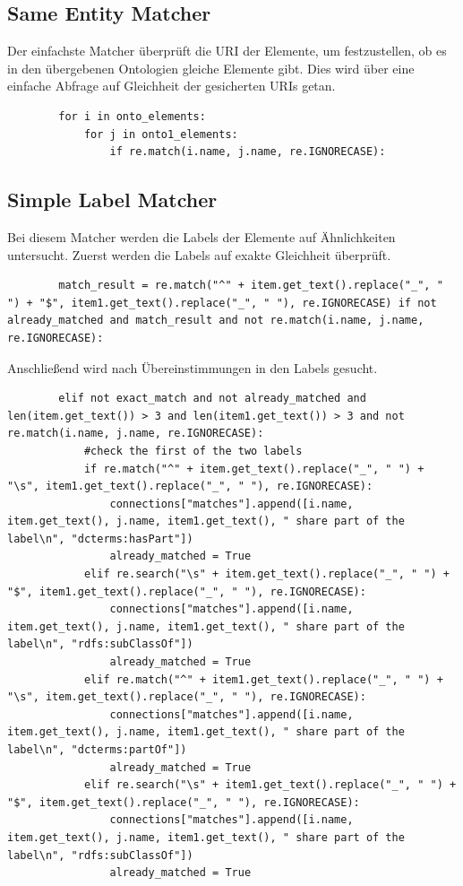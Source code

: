 		\subsection{Same Entity Matcher}
		Der einfachste Matcher überprüft die URI der Elemente, um festzustellen, ob es
		in den übergebenen Ontologien gleiche Elemente gibt. Dies wird über eine
		einfache Abfrage auf Gleichheit der gesicherten URIs getan.
		\begin{lstlisting}
		for i in onto_elements:
			for j in onto1_elements:
				if re.match(i.name, j.name, re.IGNORECASE):
		\end{lstlisting}
		
		\subsection{Simple Label Matcher}
		\label{simpleOntologyMatcher}
		Bei diesem Matcher werden die Labels der Elemente auf Ähnlichkeiten
		untersucht.
		Zuerst werden die Labels auf exakte Gleichheit überprüft.
		\begin{lstlisting}
		match_result = re.match("^" + item.get_text().replace("_", " ") + "$", item1.get_text().replace("_", " "), re.IGNORECASE) if not already_matched and match_result and not re.match(i.name, j.name, re.IGNORECASE):
		\end{lstlisting}
		Anschließend wird nach Übereinstimmungen in den Labels gesucht.
		\begin{lstlisting}
		elif not exact_match and not already_matched and len(item.get_text()) > 3 and len(item1.get_text()) > 3 and not re.match(i.name, j.name, re.IGNORECASE):
            #check the first of the two labels
            if re.match("^" + item.get_text().replace("_", " ") + "\s", item1.get_text().replace("_", " "), re.IGNORECASE):
                connections["matches"].append([i.name, item.get_text(), j.name, item1.get_text(), " share part of the label\n", "dcterms:hasPart"])
                already_matched = True
            elif re.search("\s" + item.get_text().replace("_", " ") + "$", item1.get_text().replace("_", " "), re.IGNORECASE):
                connections["matches"].append([i.name, item.get_text(), j.name, item1.get_text(), " share part of the label\n", "rdfs:subClassOf"])
                already_matched = True
            elif re.match("^" + item1.get_text().replace("_", " ") + "\s", item.get_text().replace("_", " "), re.IGNORECASE):
                connections["matches"].append([i.name, item.get_text(), j.name, item1.get_text(), " share part of the label\n", "dcterms:partOf"])
                already_matched = True
            elif re.search("\s" + item1.get_text().replace("_", " ") + "$", item.get_text().replace("_", " "), re.IGNORECASE):
                connections["matches"].append([i.name, item.get_text(), j.name, item1.get_text(), " share part of the label\n", "rdfs:subClassOf"])
                already_matched = True
		\end{lstlisting}
